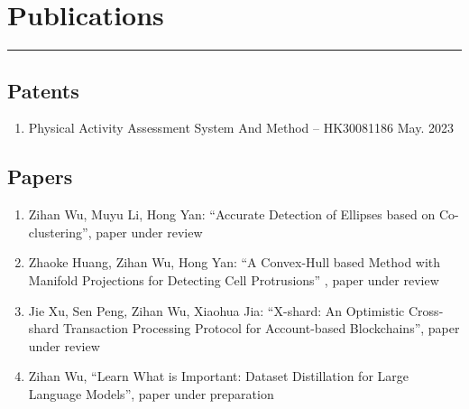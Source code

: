 \documentclass{article}
\newcommand{\cussection}[1]{\vspace{--0.05in}\section*{#1}\vspace{--0.1in} \hrule\vspace{0.2in} }
\begin{document}
\cussection{Publications}

\subsection*{Patents}
\begin{enumerate}
    \item Physical Activity Assessment System And Method -- HK30081186 \hfill May. 2023
\end{enumerate}


\subsection*{Papers}
\begin{enumerate}

    \item Zihan Wu, Muyu Li, Hong Yan: ``Accurate Detection of Ellipses based on Co-clustering'', paper under review
    \item Zhaoke Huang, Zihan Wu, Hong Yan: ``A Convex-Hull based Method with Manifold Projections for Detecting Cell Protrusions'' , paper under review
    \item Jie Xu, Sen Peng, Zihan Wu, Xiaohua Jia: ``X-shard: An Optimistic Cross-shard Transaction Processing Protocol for
    Account-based Blockchains'', paper under review
    \item Zihan Wu, ``Learn What is Important: Dataset Distillation for Large Language Models'', paper under preparation
\end{enumerate}
    
    





\end{document}
